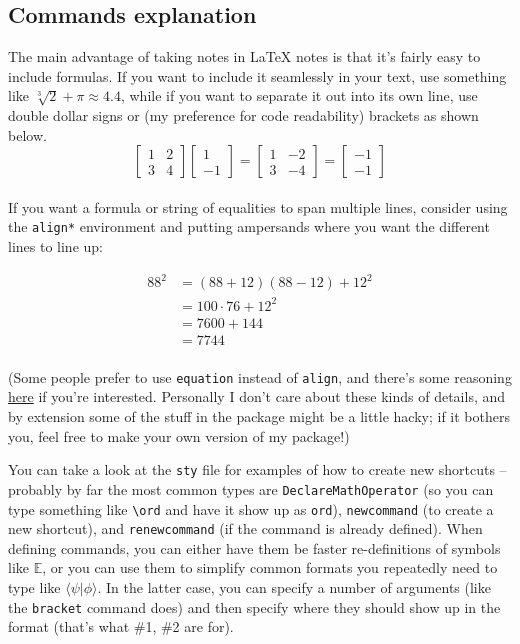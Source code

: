 \documentclass[11pt]{article}
\begin{document}
\subsection{Commands explanation}
The main advantage of taking notes in LaTeX notes is that it's fairly easy to
include formulas. If you want to include it seamlessly in your text, use
something like \(\sqrt[3]{2} + \pi \approx 4.4\), while if you want to separate
it out into its own line, use double dollar signs or (my preference for code
readability) brackets as shown below. \\
\[
    \begin{bmatrix}
        1 & 2 \\
        3 & 4
    \end{bmatrix}
    \begin{bmatrix}
        1 \\
        -1
    \end{bmatrix}
    =
    \begin{bmatrix}
        1 & -2 \\
        3 & -4
    \end{bmatrix}
    =
    \begin{bmatrix}
        -1 \\
        -1
    \end{bmatrix}
\]
\\
If you want a formula or string of equalities to span multiple lines, consider using the \texttt{align*} environment and putting ampersands where you want the different lines to line up:

\begin{align*}
    88^2 & = (88 + 12)(88 - 12) + 12^2 \\
         & = 100 \cdot 76 + 12^2       \\
         & = 7600 + 144                \\
         & = 7744                      \\
\end{align*}

(Some people prefer to use \texttt{equation} instead of \texttt{align}, and there's some reasoning \href{https://tex.stackexchange.com/questions/196/eqnarray-vs-align}{here} if you're interested. Personally I don't care about these kinds of details, and by extension some of the stuff in the package might be a little hacky; if it bothers you, feel free to make your own version of my package!)

You can take a look at the \texttt{sty} file for examples of how to create new
shortcuts -- probably by far the most common types are
\texttt{DeclareMathOperator} (so you can type something like
\texttt{\textbackslash ord} and have it show up as \texttt{ord}),
\texttt{newcommand} (to create a new shortcut), and \texttt{renewcommand} (if
the command is already defined). When defining commands, you can either have
them be faster re-definitions of symbols like \(\mathbb{E}\), or you can use
them to simplify common formats you repeatedly need to type like \(\langle \psi
| \phi \rangle\). In the latter case, you can specify a number of arguments
(like the \texttt{bracket} command does) and then specify where they should
show up in the format (that's what \#1, \#2 are for).
\end{document}

